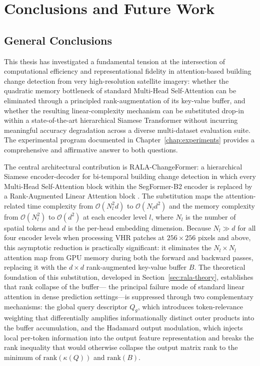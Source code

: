 \chapter{Conclusions and Future Work}
\label{chap:conclusiones}

\section{General Conclusions}
\label{sec:conclusions-general}

This thesis has investigated a fundamental tension at the intersection of
computational efficiency and representational fidelity in attention-based
building change detection from very high-resolution satellite imagery: whether
the quadratic memory bottleneck of standard Multi-Head Self-Attention can be
eliminated through a principled rank-augmentation of its key-value buffer,
and whether the resulting linear-complexity mechanism can be substituted
drop-in within a state-of-the-art hierarchical Siamese Transformer without
incurring meaningful accuracy degradation across a diverse multi-dataset
evaluation suite. The experimental program documented in
Chapter~\ref{chap:experiments} provides a comprehensive and affirmative answer
to both questions.

The central architectural contribution is RALA-ChangeFormer: a hierarchical
Siamese encoder-decoder for bi-temporal building change detection in which every
Multi-Head Self-Attention block within the SegFormer-B2 encoder is replaced by
a Rank-Augmented Linear Attention block \cite{Fan2025RALA}. The substitution
maps the attention-related time complexity from $\mathcal{O}(N_l^2 d)$ to
$\mathcal{O}(N_l d^2)$ and the memory complexity from $\mathcal{O}(N_l^2)$ to
$\mathcal{O}(d^2)$ at each encoder level $l$, where $N_l$ is the number of
spatial tokens and $d$ is the per-head embedding dimension. Because $N_l \gg d$
for all four encoder levels when processing VHR patches at $256 \times 256$
pixels and above, this asymptotic reduction is practically significant: it
eliminates the $N_l \times N_l$ attention map from GPU memory during both the
forward and backward passes, replacing it with the $d \times d$ rank-augmented
key-value buffer $B$. The theoretical foundation of this substitution, developed
in Section~\ref{sec:rala-theory}, establishes that rank collapse of the buffer---
the principal failure mode of standard linear attention in dense prediction
settings---is suppressed through two complementary mechanisms: the global query
descriptor $Q_g$, which introduces token-relevance weighting that differentially
amplifies informationally distinct outer products into the buffer accumulation,
and the Hadamard output modulation, which injects local per-token information
into the output feature representation and breaks the rank inequality that would
otherwise collapse the output matrix rank to the minimum of $\mathrm{rank}(\kappa(Q))$
and $\mathrm{rank}(B)$.

